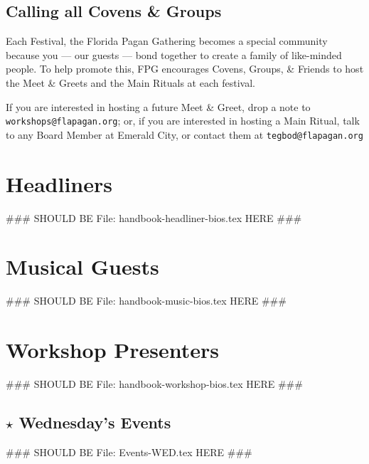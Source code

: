 \documentclass[9pt,twoside,openright,final,article,letterpaper]{memoir}
\renewcommand{\pfbreakdisplay}{%
  \needspace{24pt}%
  \vspace{8pt}\\\ding{76}\quad\ding{77}\quad\ding{78}\\%
  \vspace{11pt}}
\let\oldsection=\section
\renewcommand{\section}[1]{%
  \nopagebreak
  \vspace{6pt} %
  \needspace{1.5in}
  \oldsection{#1}
  \nopagebreak}
\let\oldsubsection=\subsection
\renewcommand{\subsection}[1]{%
  \vspace{6pt}
  \needspace{1.25in}
  \oldsubsection{#1}
  \nopagebreak}
\begin{document}
\begin{multicols}{2}


  \subsection{Calling all Covens \& Groups}

  Each Festival, the Florida Pagan Gathering becomes a special
  community because you --- our guests --- bond together to create a
  family of like-minded people. To help promote this, FPG encourages
  Covens, Groups, \& Friends to host the Meet \& Greets and the Main
  Rituals at each festival.  

  If you are interested in hosting a future Meet \& Greet, drop a note
  to \texttt{workshops@flapagan.org}; or, if you are interested in
  hosting a Main Ritual, talk to any Board Member at Emerald City, or
  contact them at \texttt{tegbod@flapagan.org}

\end{multicols}



\section{Headliners}
 ### SHOULD BE File: handbook-headliner-bios.tex HERE ### 



\section{Musical Guests}
 ### SHOULD BE File: handbook-music-bios.tex HERE ### 



\section{Workshop Presenters}
\begin{multicols}{2}
 ### SHOULD BE File: handbook-workshop-bios.tex HERE ### 


\end{multicols}



{ \hline }

\begin{multicols}{2}
  \section{{\Large $\star$} Wednesday's Events}

 ### SHOULD BE File: Events-WED.tex HERE ### 


\end{multicols}
\end{document}
